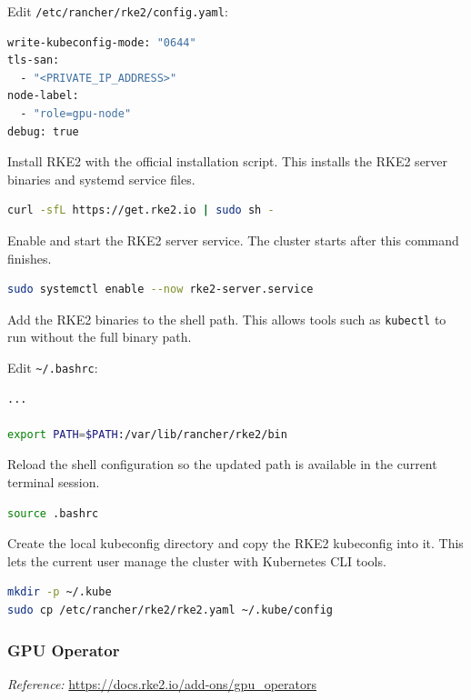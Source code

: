\documentclass{article}
\begin{document}
Edit \texttt{/etc/rancher/rke2/config.yaml}:
\begin{lstlisting}[language=sh]
write-kubeconfig-mode: "0644"
tls-san:
  - "<PRIVATE_IP_ADDRESS>"
node-label:
  - "role=gpu-node"
debug: true
\end{lstlisting}

Install RKE2 with the official installation script. This installs the RKE2 server binaries and systemd service files.

\begin{lstlisting}[language=sh]
curl -sfL https://get.rke2.io | sudo sh -
\end{lstlisting}

Enable and start the RKE2 server service. The cluster starts after this command finishes.

\begin{lstlisting}[language=sh]
sudo systemctl enable --now rke2-server.service
\end{lstlisting}

Add the RKE2 binaries to the shell path. This allows tools such as \texttt{kubectl} to run without the full binary path.

\vspace{0.5cm}

Edit \texttt{\textasciitilde{}/.bashrc}:
\begin{lstlisting}[language=sh]
...

export PATH=$PATH:/var/lib/rancher/rke2/bin
\end{lstlisting}

Reload the shell configuration so the updated path is available in the current terminal session.

\begin{lstlisting}[language=sh]
source .bashrc
\end{lstlisting}

Create the local kubeconfig directory and copy the RKE2 kubeconfig into it. This lets the current user manage the cluster with Kubernetes CLI tools.

\begin{lstlisting}[language=sh]
mkdir -p ~/.kube
sudo cp /etc/rancher/rke2/rke2.yaml ~/.kube/config
\end{lstlisting}

\vspace{0.4cm}
\subsubsection{GPU Operator}
\noindent\textit{Reference:} \url{https://docs.rke2.io/add-ons/gpu_operators}\par\vspace{0.4cm}
\end{document}
